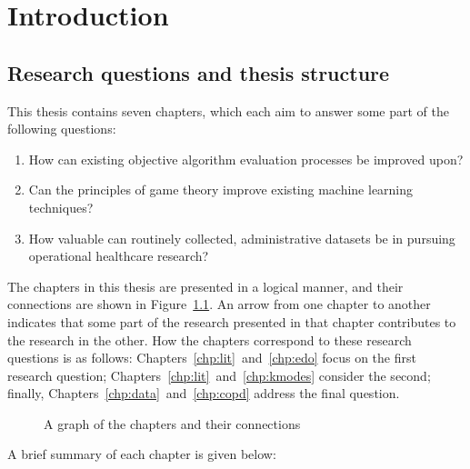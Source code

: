 \chapter{Introduction}
\label{chp:intro}

\section{Research questions and thesis structure}\label{sec:questions}

This thesis contains seven chapters, which each aim to answer some part of the
following questions:

\begin{enumerate}
    \item How can existing objective algorithm evaluation processes be improved
        upon?
    \item Can the principles of game theory improve existing machine learning
        techniques?
    \item How valuable can routinely collected, administrative datasets be in
        pursuing operational healthcare research?
\end{enumerate}

The chapters in this thesis are presented in a logical manner, and their
connections are shown in Figure~\ref{fig:chapters}. An arrow from one chapter to
another indicates that some part of the research presented in that chapter
contributes to the research in the other. How the chapters correspond to these
research questions is as follows: Chapters~\ref{chp:lit}~and~\ref{chp:edo} focus
on the first research question; Chapters~\ref{chp:lit}~and~\ref{chp:kmodes}
consider the second; finally, Chapters~\ref{chp:data}~and~\ref{chp:copd} address
the final question.

\begin{figure}
    \centering%
    \resizebox{\imgwidth}{!}{%
        
    }
    \caption{A graph of the chapters and their connections}\label{fig:chapters}
\end{figure}

A brief summary of each chapter is given below:

